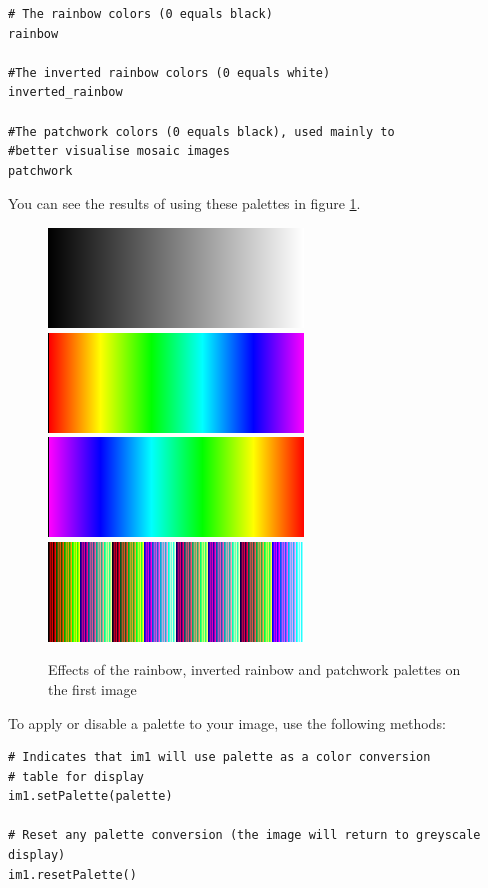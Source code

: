 \documentclass[a4paper,10pt,oneside]{article}
\begin{document}
\lstset{language=Python}
\begin{lstlisting}
# The rainbow colors (0 equals black)
rainbow

#The inverted rainbow colors (0 equals white)
inverted_rainbow

#The patchwork colors (0 equals black), used mainly to
#better visualise mosaic images
patchwork
\end{lstlisting}

You can see the results of using these palettes in figure \ref{fig:palette}.

\begin{figure}
\centering
\includegraphics[scale=0.3]{test_ramp.png}
\includegraphics[scale=0.3]{test_ramp_r.png}
\includegraphics[scale=0.3]{test_ramp_ir.png}
\includegraphics[scale=0.3]{test_ramp_p.png}
\caption{Effects of the rainbow, inverted rainbow and patchwork palettes on the first 
image}
\label{fig:palette}
\end{figure}

To apply or disable a palette to your image, use the following methods:

\lstset{language=Python}
\begin{lstlisting}
# Indicates that im1 will use palette as a color conversion
# table for display 
im1.setPalette(palette)

# Reset any palette conversion (the image will return to greyscale display)
im1.resetPalette()
\end{lstlisting}
\end{document}
